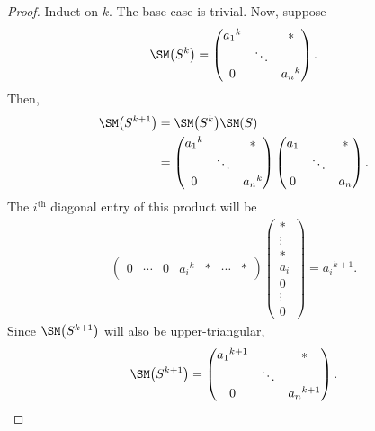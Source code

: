 \documentclass{amsart}
\begin{document}
\begin{proof}
Induct on $k.$ The base case is trivial. Now, suppose
\begin{align*}
    \SM\big(S^k\big)=\begin{pmatrix}
        {a_1}^k & & * \\
            & \ddots &  \\
        0 & & {a_n}^k
    \end{pmatrix}.
\end{align*}
Then,
\begin{align*}
    \SM\big(S^{k+1}\big) &= \SM\big(S^k\big)\SM(S) \\
                 &= \begin{pmatrix}
        {a_1}^k & & * \\
            & \ddots &  \\
        0 & & {a_n}^k
    \end{pmatrix}
    \begin{pmatrix}
        a_1 & & * \\
            & \ddots &  \\
        0 & & a_n
    \end{pmatrix}.
\end{align*}
The $i^\text{th}$ diagonal entry of this product will be
\begin{align*}
\begin{pmatrix}
    0 & \cdots & 0 & {a_i}^k & * & \cdots & *
\end{pmatrix}
\begin{pmatrix}
    * \\
    \vdots \\
    * \\
    a_i \\
    0 \\
    \vdots \\
    0
\end{pmatrix} = {a_i}^{k+1}.
\end{align*}
Since $\SM\big(S^{k+1}\big)$ will also be upper-triangular,
\begin{align*}
    \SM\big(S^{k+1}\big)=\begin{pmatrix}
        {a_1}^{k+1} & & * \\
            & \ddots & \\
        0 & & {a_n}^{k+1}
    \end{pmatrix}.
\end{align*}
\end{proof}
\end{document}

